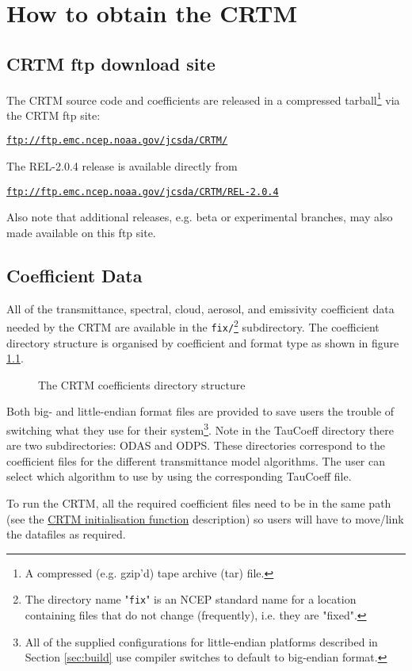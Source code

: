 \chapter{How to obtain the CRTM}

\section{CRTM ftp download site}
The CRTM source code and coefficients are released in a compressed tarball\footnote{A compressed (e.g. gzip'd) tape archive (tar) file.} via the CRTM ftp site:

\hspace{1cm}\href{ftp://ftp.emc.ncep.noaa.gov/jcsda/CRTM}{\texttt{ftp://ftp.emc.ncep.noaa.gov/jcsda/CRTM/}}

The REL-2.0.4 release is available directly from

\hspace{1cm}\href{ftp://ftp.emc.ncep.noaa.gov/jcsda/CRTM/REL-2.0.4}{\texttt{ftp://ftp.emc.ncep.noaa.gov/jcsda/CRTM/REL-2.0.4}}

Also note that additional releases, e.g. beta or experimental branches, may also made available on this ftp site.


\section{Coefficient Data}
All of the transmittance, spectral, cloud, aerosol, and emissivity coefficient data needed by the CRTM are available in the \texttt{fix/}\footnote{The directory name "\texttt{fix}" is an NCEP standard name for a location containing files that do not change (frequently), i.e. they are "fixed".} subdirectory. The coefficient directory structure is organised by coefficient and format type as shown in figure \ref{fig:crtm_coefficients_dir}.

\begin{figure}[htb]
  \centering
  
  \caption{The CRTM coefficients directory structure}
  \label{fig:crtm_coefficients_dir}
\end{figure}

Both big- and little-endian format files are provided to save users the trouble of switching what they use for their system\footnote{All of the supplied configurations for little-endian platforms described in Section \ref{sec:build} use compiler switches to default to big-endian format.}. Note in the TauCoeff directory there are two subdirectories: ODAS and ODPS. These directories correspond to the coefficient files for the different transmittance model algorithms. The user can select which algorithm to use by using the corresponding TauCoeff file.

To run the CRTM, all the required coefficient files need to be in the same path (see the  \hyperref[sec:CRTM_Init_interface]{CRTM initialisation function} description) so users will have to move/link the datafiles as required.
